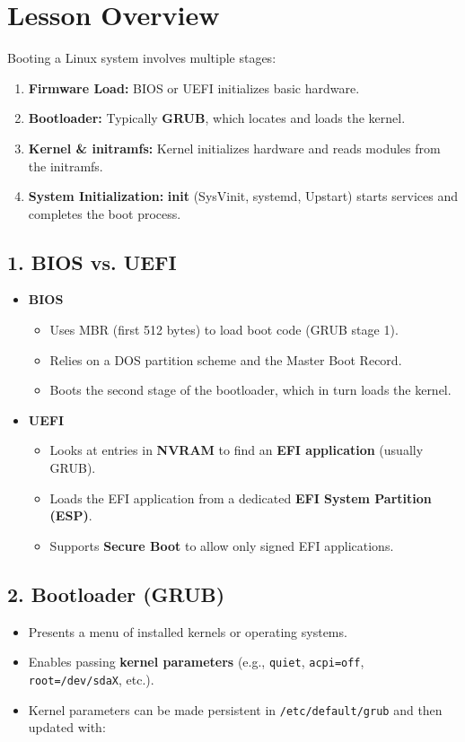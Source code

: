 \documentclass[12pt,a4paper]{report}
\begin{document}
\section*{Lesson Overview}

Booting a Linux system involves multiple stages:
\begin{enumerate}
    \item \textbf{Firmware Load:} BIOS or UEFI initializes basic hardware.
    \item \textbf{Bootloader:} Typically \textbf{GRUB}, which locates and loads the kernel.
    \item \textbf{Kernel \& initramfs:} Kernel initializes hardware and reads modules from the initramfs.
    \item \textbf{System Initialization:} \textbf{init} (SysVinit, systemd, Upstart) starts services and completes the boot process.
\end{enumerate}

\subsection*{1. BIOS vs. UEFI}
\begin{itemize}
\item\textbf{BIOS}  
\begin{itemize}
    \item Uses MBR (first 512 bytes) to load boot code (GRUB stage 1).
    \item Relies on a DOS partition scheme and the Master Boot Record.
    \item Boots the second stage of the bootloader, which in turn loads the kernel.
\end{itemize}

\item\textbf{UEFI}
\begin{itemize}
    \item Looks at entries in \textbf{NVRAM} to find an \textbf{EFI application} (usually GRUB).
    \item Loads the EFI application from a dedicated \textbf{EFI System Partition (ESP)}.
    \item Supports \textbf{Secure Boot} to allow only signed EFI applications.
\end{itemize}
\end{itemize}

\subsection*{2. Bootloader (GRUB)}
\begin{itemize}
    \item Presents a menu of installed kernels or operating systems.
    \item Enables passing \textbf{kernel parameters} (e.g., \texttt{quiet}, \texttt{acpi=off}, \texttt{root=/dev/sdaX}, etc.).
    \item Kernel parameters can be made persistent in \texttt{/etc/default/grub} and then updated with:
\end{itemize}
\end{document}

